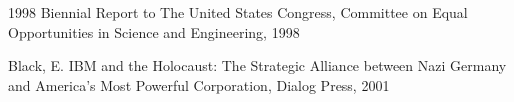 \documentclass[
12pt,		%
openright,	%
twoside,  %
a4paper,			%
chapter=TITLE,		%
english,			%
french,				%
spanish,			%
brazil				%
]{USPSC-classe/USPSC}
\begin{document}
\begin{flushleft}
\begin{flushleft}
\begin{flushleft}
\begin{flushleft}
\begin{flushleft}
\begin{flushleft}
\begin{flushleft}
\begin{flushleft}
[CONGRESS, 1998] 1998 Biennial Report to The United States Congress, Committee on Equal Opportunities in Science and Engineering, 1998
\end{flushleft}


\end{flushleft}


\end{flushleft}


\end{flushleft}


\end{flushleft}


\end{flushleft}


\end{flushleft}


\end{flushleft}


\begin{flushleft}
\begin{flushleft}
\begin{flushleft}
\begin{flushleft}
\begin{flushleft}
\begin{flushleft}
\begin{flushleft}
\begin{flushleft}
[BLACK, 2001] Black, E. IBM and the Holocaust: The Strategic Alliance between Nazi Germany and America's Most Powerful Corporation, Dialog Press, 2001
\end{flushleft}


\end{flushleft}


\end{flushleft}


\end{flushleft}


\end{flushleft}


\end{flushleft}


\end{flushleft}


\end{flushleft}
\end{document}
